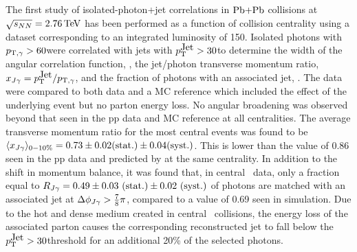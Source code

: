 The first study of isolated-photon+jet correlations in
  $\mbox{Pb+Pb}$ collisions at $\sqrt{s_{NN}} = 2.76\,\mathrm{TeV}$ has been performed as a function of collision centrality using
a dataset corresponding to an integrated luminosity of 150\mubinv. Isolated
photons with $p_{\mathrm{T},\gamma} > 60$\GeVc were correlated with jets with $p_{\mathrm{T}}^{\mbox{Jet}} > 30$\GeVc to
determine the width of the angular
correlation function, \sjg, the jet/photon transverse momentum ratio, $x_{J\gamma} = p_{\mathrm{T}}^{\mbox{Jet}}/p_{\mathrm{T},\gamma}$, and
the fraction of photons with an associated jet, \rjg.
The \PbPb{} data were compared to both \pp{} data and a \PYTHYD{} MC reference which included the effect of the underlying \PbPb event
but no parton energy loss.
No angular broadening was observed beyond that seen in the pp data and MC reference at all centralities.
The average transverse momentum ratio for the most central events was found to be
$\langle x_{J\gamma}\rangle_{0-10\%} = 0.73 \pm 0.02 \mbox{(stat.)} \pm 0.04 \mbox{(syst.)}$.
This is lower than the value of 0.86 seen in the pp data and predicted by \PYTHYD{} at the same centrality.
In addition to the shift in
momentum balance, it was found that, in central \PbPb\ data, only
a fraction equal to $R_{J\gamma} = 0.49 \pm 0.03 \mbox{ (stat.)} \pm 0.02 \mbox{ (syst.)}$ of photons are matched with an
associated jet at $\Delta\phi_{J\gamma} > \frac{7}{8} \pi$, compared to a value of 0.69 seen
in \PYTHYD{} simulation. Due to the hot and dense medium created in central \PbPb\ collisions, the energy loss of the associated parton causes the corresponding reconstructed jet to fall
below the $p_{\mathrm{T}}^{\mbox{Jet}} > 30$\GeVc threshold for an additional 20\% of the selected photons.
